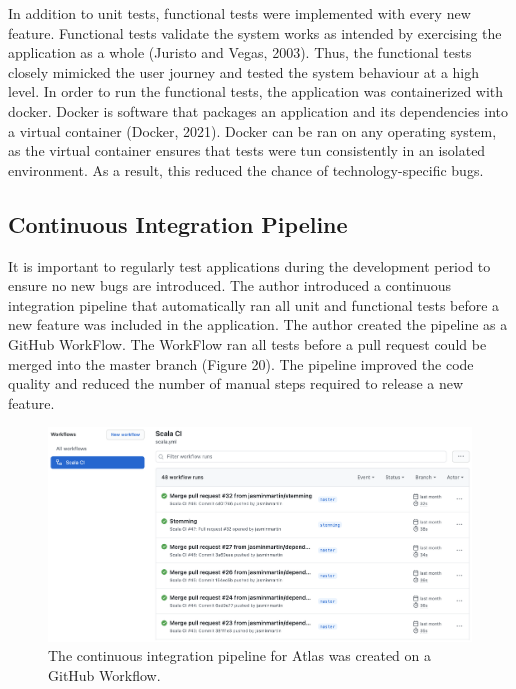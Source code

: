 \documentclass{article}
\begin{document}
In addition to unit tests, functional tests were implemented with every new feature. Functional tests validate the system works as intended by exercising the application as a whole (Juristo and Vegas,  2003). Thus, the functional tests closely mimicked the user journey and tested the system behaviour at a high level. In order to run the functional tests, the application was containerized with docker. Docker is software that packages an application and its dependencies into a virtual container (Docker, 2021). Docker can be ran on any operating system, as the virtual container ensures that tests were tun consistently in an isolated environment. As a result, this reduced the chance of technology-specific bugs. 

\subsection{Continuous Integration Pipeline}

It is important to regularly test applications during the development period to ensure no new bugs are introduced. The author introduced a continuous integration pipeline that automatically ran all unit and functional tests before a new feature was included in the application. The author created the pipeline as a GitHub WorkFlow. The WorkFlow ran all tests before a pull request could be merged into the master branch (Figure 20). The pipeline improved the code quality and reduced the number of manual steps required to release a new feature.

\begin{figure}[!htb]
  \centering
      \includegraphics[width=1\textwidth]{images/scala-ci.png}
  \caption{The continuous integration pipeline for Atlas was created on a GitHub Workflow.}
\end{figure}
\end{document}
